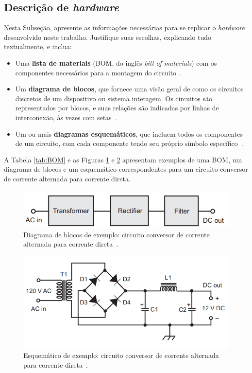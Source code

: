 \subsection{Descrição de \textit{hardware}}\label{subsec:hardware}

Nesta Subseção, apresente as informações necessárias para se replicar o \textit{hardware} desenvolvido neste trabalho. 
Justifique suas escolhas, explicando tudo textualmente, e inclua:

\begin{itemize}
    \item Uma \textbf{lista de materiais} (BOM, do inglês \textit{bill of materials}) com os componentes necessários para a montagem do circuito~\cite{ref:bom}.
    \item Um \textbf{diagrama de blocos}, que fornece uma visão geral de como os circuitos discretos de um dispositivo ou sistema interagem. Os circuitos são representados por blocos, e suas relações são indicadas por linhas de interconexão, às vezes com setas~\cite{ref:blockdiagram}.
    \item Um ou mais \textbf{diagramas esquemáticos}, que incluem todos os componentes de um circuito, com cada componente tendo seu próprio símbolo específico~\cite{ref:esquematico}.
\end{itemize}
A Tabela \ref{tab:BOM} e as Figuras \ref{fig:exemplo_diagrama} e \ref{fig:exemplo_esquem} apresentam exemplos de uma BOM, um diagrama de blocos e um esquemático correspondentes para um circuito conversor de corrente alternada para corrente direta.


\begin{figure}[!htpb]
\centering
\includegraphics[width=.9\columnwidth]{figuras/Exemplo-diagrama-de-blocos.png}
\caption{Diagrama de blocos de exemplo: circuito conversor de corrente alternada para corrente direta~\cite{ref:block_n_schematic}.}
\label{fig:exemplo_diagrama}
\end{figure}

\begin{figure}[!htpb]
\centering
\includegraphics[width=.9\columnwidth]{figuras/Esquematico.png}
\caption{Esquemático de exemplo: circuito conversor de corrente alternada para corrente direta~\cite{ref:block_n_schematic}.}
\label{fig:exemplo_esquem}
\end{figure}


